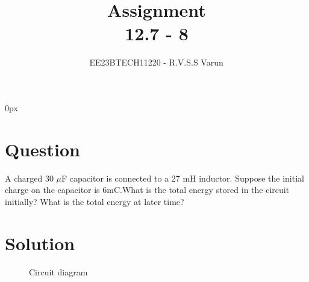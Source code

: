 \documentclass[beamer]{IEEEtran}
\theoremstyle{remark}
\begin{document}
\parindent 0px


\title{Assignment\\[1ex]12.7 - 8}
\author{EE23BTECH11220 - R.V.S.S Varun$^{}$%
}
\maketitle
\newpage
\bigskip

\renewcommand{\thefigure}{\theenumi}
\renewcommand{\thetable}{\theenumi}
\section*{Question}
A charged 30 $\mu$F capacitor is connected to a 27 mH inductor. Suppose the initial charge on the capacitor is 6mC.What is the total energy stored in the circuit initially? What is the
total energy at later time?
\section*{Solution}
\begin{figure}[h]


  
    

    



  
  
       
  
    \caption{Circuit diagram}
     
   \label{fig:12.7.8.1}
\end{figure}
\end{document}
